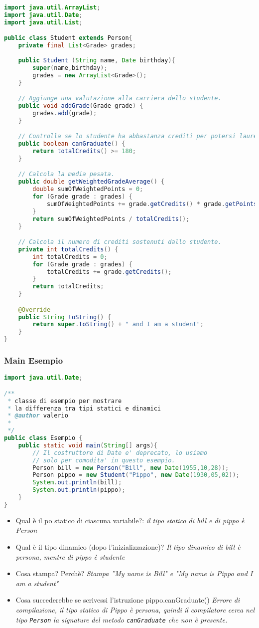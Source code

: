 \documentclass{article}
\begin{document}
\begin{lstlisting}[language=Java,escapechar=|]
import java.util.ArrayList;
import java.util.Date;
import java.util.List;

public class Student extends Person{
	private final List<Grade> grades; 
	
	public Student (String name, Date birthday){
		super(name,birthday);		
		grades = new ArrayList<Grade>();
	}

	// Aggiunge una valutazione alla carriera dello studente.
	public void addGrade(Grade grade) {
		grades.add(grade);
	}

	// Controlla se lo studente ha abbastanza crediti per potersi laureare.
	public boolean canGraduate() {
		return totalCredits() >= 180;
	}

	// Calcola la media pesata.
	public double getWeightedGradeAverage() {
		double sumOfWeightedPoints = 0;
		for (Grade grade : grades) {
			sumOfWeightedPoints += grade.getCredits() * grade.getPoints();
		}
		return sumOfWeightedPoints / totalCredits();
	}

	// Calcola il numero di crediti sostenuti dallo studente.
	private int totalCredits() {
		int totalCredits = 0;
		for (Grade grade : grades) {
			totalCredits += grade.getCredits();
		}
		return totalCredits;
	}

	@Override
	public String toString() {
		return super.toString() + " and I am a student";
	}
}
\end{lstlisting}

\subsubsection{Main Esempio}
\begin{lstlisting}[language=Java,escapechar=|]
import java.util.Date;

/**
 * classe di esempio per mostrare 
 * la differenza tra tipi statici e dinamici
 * @author valerio
 *
 */
public class Esempio {
	public static void main(String[] args){
		// Il costruttore di Date e' deprecato, lo usiamo
		// solo per comodita' in questo esempio.
		Person bill = new Person("Bill", new Date(1955,10,28));
		Person pippo = new Student("Pippo", new Date(1930,05,02));		
		System.out.println(bill);
		System.out.println(pippo);
	}
}
\end{lstlisting}
\begin{itemize}
\item Qual \`e il po statico di ciascuna variabile?: \textit{il tipo statico di bill e di pippo \`e Person}
\item Qual \`e il tipo dinamico (dopo l'inizializzazione)? \textit{Il tipo dinamico di bill \`e persona, mentre di pippo \`e studente}
\item  Cosa stampa? Perch\`e? \textit{Stampa ''My name is Bill" e "My name is Pippo and I am a student"} 
\item  Cosa succederebbe se scrivessi l’istruzione pippo.canGraduate() \textit{Errore di compilazione, il tipo statico di Pippo \`e persona, quindi il compilatore cerca nel tipo \texttt{Person} la signature del metodo \texttt{canGraduate} che non \`e presente.}
\end{itemize}
\end{document}
